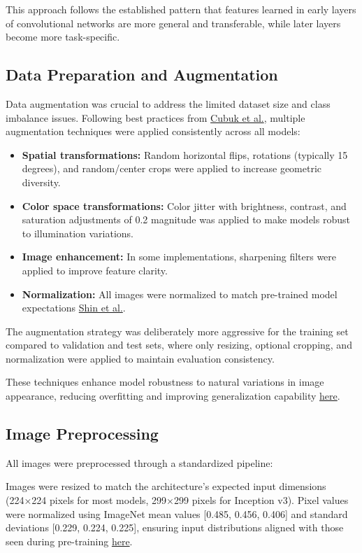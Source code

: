 \documentclass[a4paper,12pt]{article}
\begin{document}
This approach follows the established pattern that features learned in early layers of convolutional networks are more general and transferable, while later layers become more task-specific.

\subsection{Data Preparation and Augmentation}

Data augmentation was crucial to address the limited dataset size and class imbalance issues. Following best practices from \href{https://arxiv.org/abs/1712.04621}{Cubuk et al.}, multiple augmentation techniques were applied consistently across all models:

\begin{itemize}
    \item \textbf{Spatial transformations:} Random horizontal flips, rotations (typically 15 degrees), and random/center crops were applied to increase geometric diversity.
    \item \textbf{Color space transformations:} Color jitter with brightness, contrast, and saturation adjustments of 0.2 magnitude was applied to make models robust to illumination variations.
    \item \textbf{Image enhancement:} In some implementations, sharpening filters were applied to improve feature clarity.
    \item \textbf{Normalization:} All images were normalized to match pre-trained model expectations \href{https://arxiv.org/abs/1803.08494}{Shin et al.}.
\end{itemize}

The augmentation strategy was deliberately more aggressive for the training set compared to validation and test sets, where only resizing, optional cropping, and normalization were applied to maintain evaluation consistency.

These techniques enhance model robustness to natural variations in image appearance, reducing overfitting and improving generalization capability \href{https://arxiv.org/abs/1712.04621}{here}.

\subsection{Image Preprocessing}

All images were preprocessed through a standardized pipeline:

Images were resized to match the architecture's expected input dimensions (224×224 pixels for most models, 299×299 pixels for Inception v3). Pixel values were normalized using ImageNet mean values [0.485, 0.456, 0.406] and standard deviations [0.229, 0.224, 0.225], ensuring input distributions aligned with those seen during pre-training \href{https://openaccess.thecvf.com/content_cvpr_2016/papers/He_Deep_Residual_Learning_CVPR_2016_paper.pdf}{here}.
\end{document}
